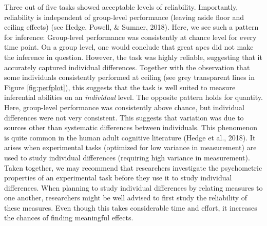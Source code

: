 \documentclass[10pt, letterpaper]{article}
\begin{document}
Three out of five tasks showed acceptable levels of reliability.
Importantly, reliability is independent of group-level performance
(leaving aside floor and ceiling effects) (see Hedge, Powell, \& Sumner,
2018). Here, we see such a pattern for inference: Group-level
performance was consistently at chance level for every time point. On a
group level, one would conclude that great apes did not make the
inference in question. However, the task was highly reliable, suggesting
that it accurately captured individual differences. Together with the
observation that some individuals consistently performed at ceiling (see
grey transparent lines in Figure \ref{fig:perfplot}), this suggests that
the task is well suited to measure inferential abilities on an
\emph{individual} level. The opposite pattern holds for quantity. Here,
group-level performance was consistently above chance, but individual
differences were not very consistent. This suggests that variation was
due to sources other than systematic differences between individuals.
This phenomenon is quite common in the human adult cognitive literature
(Hedge et al., 2018). It arises when experimental tasks (optimized for
low variance in measurement) are used to study individual differences
(requiring high variance in measurement). Taken together, we may
recommend that researchers investigate the psychometric properties of an
experimental task before they use it to study individual differences.
When planning to study individual differences by relating measures to
one another, researchers might be well advised to first study the
reliability of these measures. Even though this takes considerable time
and effort, it increases the chances of finding meaningful effects.
\end{document}
